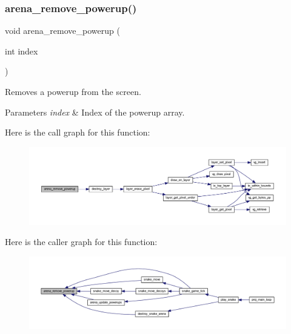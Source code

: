 \subsubsection{\texorpdfstring{arena\+\_\+remove\+\_\+powerup()}{arena\_remove\_powerup()}}
{\footnotesize\ttfamily void arena\+\_\+remove\+\_\+powerup (\begin{DoxyParamCaption}\item[{int}]{index }\end{DoxyParamCaption})}



Removes a powerup from the screen. 


\begin{DoxyParams}{Parameters}
{\em index} & Index of the powerup array. \\
\hline
\end{DoxyParams}
Here is the call graph for this function\+:\nopagebreak
\begin{figure}[H]
\begin{center}
\leavevmode
\includegraphics[width=350pt]{group__snake_ga28f1d377ae0f0b900ce5dbe1ff0f64c3_cgraph}
\end{center}
\end{figure}
Here is the caller graph for this function\+:\nopagebreak
\begin{figure}[H]
\begin{center}
\leavevmode
\includegraphics[width=350pt]{group__snake_ga28f1d377ae0f0b900ce5dbe1ff0f64c3_icgraph}
\end{center}
\end{figure}
\mbox{\label{group__snake_ga4890845dc17bb18e466ffc2590f1d067}} 

